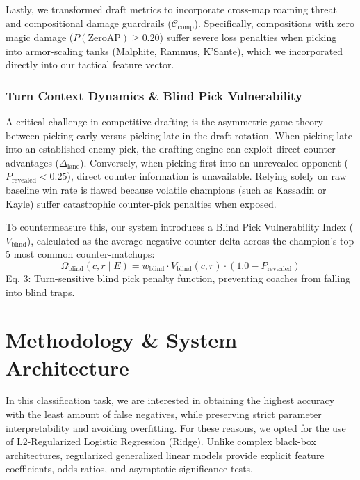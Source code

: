 \documentclass[11pt,letterpaper]{article}
\begin{document}
Lastly, we transformed draft metrics to incorporate cross-map roaming threat and compositional damage guardrails ($\mathcal{C}_{\text{comp}}$). Specifically, compositions with zero magic damage ($P(\text{ZeroAP}) \ge 0.20$) suffer severe loss penalties when picking into armor-scaling tanks (Malphite, Rammus, K'Sante), which we incorporated directly into our tactical feature vector.

\subsubsection{Turn Context Dynamics \& Blind Pick Vulnerability}

A critical challenge in competitive drafting is the asymmetric game theory between picking early versus picking late in the draft rotation. When picking late into an established enemy pick, the drafting engine can exploit direct counter advantages ($\Delta_{\text{lane}}$). Conversely, when picking first into an unrevealed opponent ($P_{\text{revealed}} < 0.25$), direct counter information is unavailable. Relying solely on raw baseline win rate is flawed because volatile champions (such as Kassadin or Kayle) suffer catastrophic counter-pick penalties when exposed.

To countermeasure this, our system introduces a Blind Pick Vulnerability Index ($V_{\text{blind}}$), calculated as the average negative counter delta across the champion's top 5 most common counter-matchups:
\begin{equation}
\Omega_{\text{blind}}(c, r \mid E) = w_{\text{blind}} \cdot V_{\text{blind}}(c, r) \cdot (1.0 - P_{\text{revealed}})
\end{equation}
Eq. 3: Turn-sensitive blind pick penalty function, preventing coaches from falling into blind traps.

\clearpage

\enlargethispage{2.5\baselineskip}
\section{Methodology \& System Architecture}

In this classification task, we are interested in obtaining the highest accuracy with the least amount of false negatives, while preserving strict parameter interpretability and avoiding overfitting. For these reasons, we opted for the use of L2-Regularized Logistic Regression (Ridge). Unlike complex black-box architectures, regularized generalized linear models provide explicit feature coefficients, odds ratios, and asymptotic significance tests.
\end{document}
